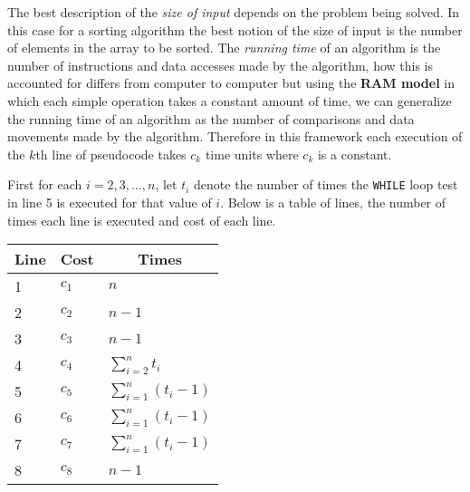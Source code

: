 \documentclass[12pt letter]{report}
\begin{document}
The best description of the \textit{size of input} depends on the problem being solved. In this case for a sorting algorithm the
best notion of the size of input is the number of elements in the array to be sorted. The \textit{running time} of an
algorithm is the number of instructions and data accesses made by the algorithm, how this is accounted for differs from
computer to computer but using the \textbf{RAM model} in which each simple operation takes a constant amount of time, we
can generalize the running time of an algorithm as the number of comparisons and data movements made by the algorithm.
Therefore in this framework each execution of the $k$th line of pseudocode takes $c_k$ time units where $c_k$ is a
constant.

First for each $i = 2,3,\ldots,n$, let $t_i$ denote the number of times the \lstinline{WHILE} loop test in line 5 is executed for
that value of $i$. Below is a table of lines, the number of times each line is executed and cost of each line.

\begin{table}
  \begin{center}
    \begin{tabular}[c]{|l|l|l|}
      \hline
      \multicolumn{1}{|c|}{\textbf{Line}} &
      \multicolumn{1}{c|}{\textbf{Cost}}  &
      \multicolumn{1}{c|}{\textbf{Times}}                                                    \\
      \hline
      1                                   & $c_1$ & $n$                                      \\

      2                                   & $c_2$ & $n-1$                                    \\

      3                                   & $c_3$ & $n-1$                                    \\

      4                                   & $c_4$ & $\sum_{i=2}^{n} t_i$                     \\

      5                                   & $c_5$ & $\sum_{i=1}^{n} \left( t_i - 1 \right) $ \\

      6                                   & $c_6$ & $\sum_{i=1}^{n} \left( t_i - 1 \right) $ \\

      7                                   & $c_7$ & $\sum_{i=1}^{n} \left( t_i - 1 \right) $ \\

      8                                   & $c_8$ & $n-1$                                    \\


      \hline
    \end{tabular}
  \end{center}
\end{table}
\end{document}
